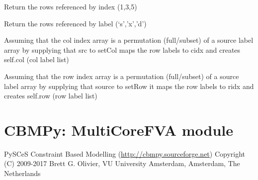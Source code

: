 \documentclass[a4paper,11pt,english]{sphinxmanual}
\begin{document}
\begin{fulllineitems}
\begin{fulllineitems}
\label{modules_doc:cbmpy.PyscesStoich.StructMatrix.getRowsByIdx}
Return the rows referenced by index (1,3,5)

\end{fulllineitems}


\begin{fulllineitems}
\label{modules_doc:cbmpy.PyscesStoich.StructMatrix.getRowsByName}
Return the rows referenced by label (`s','x','d')

\end{fulllineitems}


\begin{fulllineitems}
\label{modules_doc:cbmpy.PyscesStoich.StructMatrix.setCol}
Assuming that the col index array is a permutation (full/subset)
of a source label array by supplying that src to setCol
maps the row labels to cidx and creates self.col (col label list)

\end{fulllineitems}


\begin{fulllineitems}
\label{modules_doc:cbmpy.PyscesStoich.StructMatrix.setRow}
Assuming that the row index array is a permutation (full/subset)
of a source label array by supplying that source to setRow it
maps the row labels to ridx and creates self.row (row label list)

\end{fulllineitems}


\end{fulllineitems}

\label{modules_doc:module-cbmpy._multicorefva}

\section{CBMPy: MultiCoreFVA module}
\label{modules_doc:cbmpy-multicorefva-module}
PySCeS Constraint Based Modelling (\url{http://cbmpy.sourceforge.net})
Copyright (C) 2009-2017 Brett G. Olivier, VU University Amsterdam, Amsterdam, The Netherlands
\end{document}
